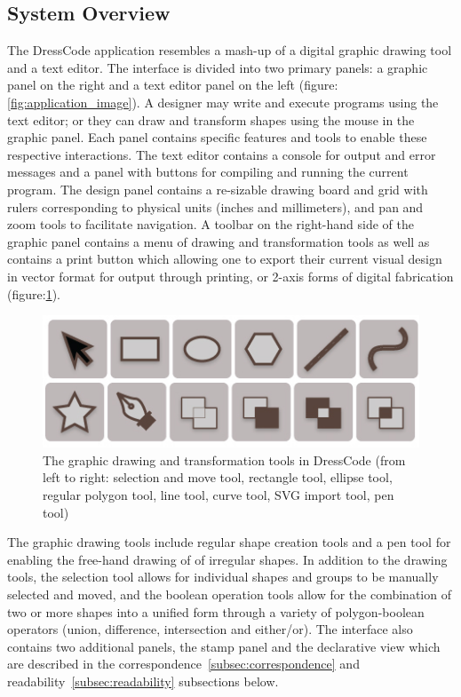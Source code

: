 \documentclass{sigchi}
\begin{document}
\subsection{System Overview}
The DressCode application resembles a mash-up of a digital graphic drawing tool and a text editor. The interface is divided into two primary panels: a graphic panel on the right and a text editor panel on the left (figure:\ref{fig:application_image}). A designer may write and execute programs using the text editor; or they can draw and transform shapes using the mouse in the graphic panel. Each panel contains specific features and tools to enable these respective interactions. The text editor contains a console for output and error messages and a panel with buttons for compiling and running the current program. The design panel contains a re-sizable drawing board and grid with rulers corresponding to physical units (inches and millimeters), and pan and zoom tools to facilitate navigation. A toolbar on the right-hand side of the graphic panel contains a menu of drawing and transformation tools as well as contains a print button which allowing one to export their current visual design in vector format for output through printing, or 2-axis forms of digital fabrication (figure:\ref{fig:graphic_tools}).

\begin{center}
\begin{figure}[h!]
\includegraphics[width=\columnwidth]{images/graphic_tools.jpg}
\caption{The graphic drawing and transformation tools in DressCode (from left to right: selection and move tool, rectangle tool, ellipse tool, regular polygon tool, line tool, curve tool, SVG import tool, pen tool)}
\label{fig:graphic_tools}
\end{figure}
\end{center}
\vspace{-20pt}

The graphic drawing tools include regular shape creation tools and a pen tool for enabling the free-hand drawing of of irregular shapes. In addition to the drawing tools, the selection tool allows for individual shapes and groups to be manually selected and moved, and the boolean operation tools allow for the combination of two or more shapes into a unified form through a variety of polygon-boolean operators (union, difference, intersection and either/or). The interface also contains two additional panels, the stamp panel and the declarative view which are described in the correspondence~\ref{subsec:correspondence} and readability~\ref{subsec:readability} subsections below.
\end{document}
